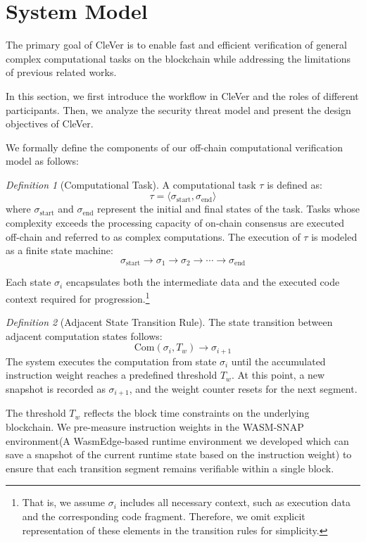 \documentclass[3p]{elsarticle}
\theoremstyle{remark}
\newtheorem{definition}{Definition}
\begin{document}
\section{System Model}

The primary goal of CleVer is to enable fast and efficient verification of general complex computational tasks on the blockchain while addressing the limitations of previous related works.

In this section, we first introduce the workflow in CleVer and the roles of different participants. Then, we analyze the security threat model and present the design objectives of CleVer.


We formally define the components of our off-chain computational verification model as follows:

\begin{definition}[Computational Task]\label{def-task}
A computational task $\tau$ is defined as:
\[
\tau = \langle \sigma_{\text{start}}, \sigma_{\text{end}} \rangle
\]
where $\sigma_{\text{start}}$ and $\sigma_{\text{end}}$ represent the initial and final states of the task. Tasks whose complexity exceeds the processing capacity of on-chain consensus are executed off-chain and referred to as complex computations.
The execution of $\tau$ is modeled as a finite state machine:
\[
\sigma_{\text{start}} \to \sigma_1 \to \sigma_2 \to \cdots \to \sigma_{\text{end}}
\]
\end{definition}

Each state $\sigma_i$ encapsulates both the intermediate data and the executed code context required for progression.\footnote{That is, we assume $\sigma_i$ includes all necessary context, such as execution data and the corresponding code fragment. Therefore, we omit explicit representation of these elements in the transition rules for simplicity.}

\begin{definition}[Adjacent State Transition Rule]\label{def:snap-standard}
The state transition between adjacent computation states follows:
\[
\text{Com}(\sigma_i, T_w) \rightarrow \sigma_{i+1}
\]
The system executes the computation from state $\sigma_i$ until the accumulated instruction weight reaches a predefined threshold $T_w$. At this point, a new snapshot is recorded as $\sigma_{i+1}$, and the weight counter resets for the next segment.
\end{definition}

The threshold $T_w$ reflects the block time constraints on the underlying blockchain. We pre-measure instruction weights in the WASM-SNAP environment(A WasmEdge-based runtime environment we developed which can save a snapshot of the current runtime state based on the instruction weight) to ensure that each transition segment remains verifiable within a single block.
\end{document}
